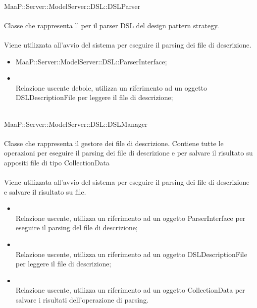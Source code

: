 \\
MaaP::Server::ModelServer::DSL::DSLParser\\
\\
Classe che rappresenta l' per il parser DSL del design pattern strategy.\\
\\
Viene utilizzata all'avvio del sistema per eseguire il parsing dei file di descrizione.\\
\begin{itemize}
\item MaaP::Server::ModelServer::DSL::ParserInterface;
\end{itemize}
\begin{itemize}
\item{}\\
Relazione uscente debole, utilizza un riferimento ad un oggetto DSLDescriptionFile per leggere il file di descrizione;
\end{itemize}

\\
MaaP::Server::ModelServer::DSL::DSLManager\\
\\
Classe che rappresenta il gestore dei file di descrizione. Contiene tutte le operazioni per eseguire il parsing dei file di descrizione e per salvare il risultato su appositi file di tipo CollectionData\\
\\
Viene utilizzata all'avvio del sistema per eseguire il parsing dei file di descrizione e salvare il risultato su file.\\
\begin{itemize}
\item{}\\
Relazione uscente, utilizza un riferimento ad un oggetto ParserInterface per eseguire il parsing del file di descrizione;
\item{}\\
Relazione uscente, utilizza un riferimento ad un oggetto DSLDescriptionFile per leggere il file di descrizione;
\item{}\\
Relazione uscente, utilizza un riferimento ad un oggetto CollectionData per salvare i risultati dell'operazione di parsing.
\end{itemize}

